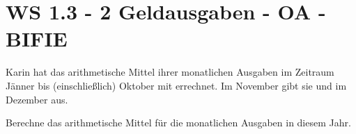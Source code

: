 \section{WS 1.3 - 2 Geldausgaben - OA - BIFIE}

\begin{beispiel}[WS 1.3]{1} %
Karin hat das arithmetische Mittel ihrer monatlichen Ausgaben im Zeitraum Jänner bis (einschließlich) Oktober mit  errechnet. Im November gibt sie  und im Dezember  aus.

Berechne das arithmetische Mittel für die monatlichen Ausgaben in diesem Jahr.
\\

\end{beispiel}